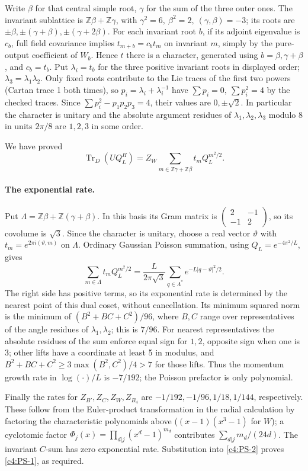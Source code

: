 Write \(\beta\) for that central simple root, \(\gamma\) for the sum of the three outer ones. The invariant sublattice is \(\mathbb Z\beta+\mathbb Z\gamma\), with \(\gamma^2=6,\ \beta^2=2,\ (\gamma,\beta)=-3\); its roots are \(\pm\beta,\pm(\gamma+\beta),\pm(\gamma+2\beta)\). For each invariant root \(b\), if its adjoint eigenvalue is \(c_b\), full field covariance implies \(t_{m+b}=c_b t_m\) on invariant \(m\), simply by the pure-output coefficient of \(W_b\). Hence \(t\) there is a character, generated using \(b=\beta,\gamma+\beta\), and \(c_b=t_b\). Put \(\lambda_i=t_b\) for the three positive invariant roots in displayed order; \(\lambda_3=\lambda_1\lambda_2\). Only fixed roots contribute to the Lie traces of the first two powers (Cartan trace 1 both times), so \(p_i=\lambda_i+\lambda_i^{-1}\) have \(\sum p_i=0,\ \sum p_i^2=4\) by the checked traces. Since \(\sum p_i^2-p_1p_2p_3=4\), their values are \(0,\pm\sqrt2\). In particular the character is unitary and the absolute argument residues of \(\lambda_1,\lambda_2,\lambda_3\) modulo 8 in units \(2\pi/8\) are \(1,2,3\) in some order.

We have proved
\[
 \operatorname{Tr}_D(UQ_L^H)
     =Z_W\sum_{m\in\mathbb Z\gamma+\mathbb Z\beta} t_m Q_L^{m^2/2}.
\]
\paragraph{The exponential rate.}
Put \(\Lambda=\mathbb Z\beta+\mathbb Z(\gamma+\beta)\). In this basis
its Gram matrix is \(\left(\begin{smallmatrix}2&-1\\-1&2\end{smallmatrix}\right)\),
so its covolume is \(\sqrt3\). Since the character is unitary, choose a
real vector \(\vartheta\) with
\(t_m=e^{2\pi i(\vartheta,m)}\) on \(\Lambda\). Ordinary Gaussian
Poisson summation, using \(Q_L=e^{-4\pi^2/L}\), gives
\[
 \sum_{m\in\Lambda}t_m Q_L^{m^2/2}
   =\frac{L}{2\pi\sqrt3}
        \sum_{q\in\Lambda^*}e^{-L|q-\vartheta|^2/2}.
\]
The right side has positive terms, so its exponential rate is determined
by the nearest point of this dual coset, without cancellation.
Its minimum squared norm is the minimum of
\((B^2+BC+C^2)/96\), where \(B,C\) range over representatives of the
angle residues of \(\lambda_1,\lambda_2\); this is \(7/96\).
For nearest representatives the absolute residues of the sum enforce
equal sign for \(1,2\), opposite sign when one is 3; other lifts have a
coordinate at least 5 in modulus, and
\(B^2+BC+C^2\ge 3\max(B^2,C^2)/4>7\) for those lifts.
Thus the momentum growth rate in \(\log(\cdot)/L\) is \(-7/192\);
the Poisson prefactor is only polynomial.

Finally the rates for \(Z_{B'},Z_C,Z_W,Z_{B_4}\) are \(-1/192,-1/96,1/18,1/144\), respectively. These follow from the Euler-product transformation in the radial calculation by factoring the characteristic polynomials above (\((x-1)(x^3-1)\) for \(W\)); a cyclotomic factor \(\Phi_j(x)=\prod_{d|j}(x^d-1)^{m_d}\) contributes \(\sum_{d|j}m_d/(24d)\). The invariant \(C\)-sum has zero exponential rate. Substitution into \eqref{c4:PS-2} proves \eqref{c4:PS-1}, as required.

